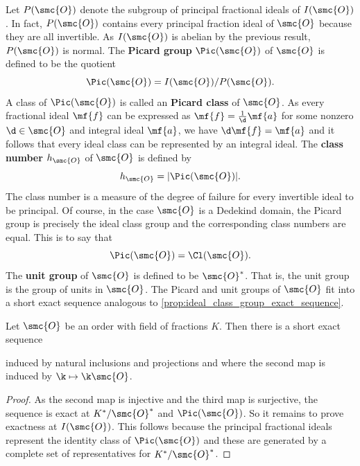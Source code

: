 \documentclass[12pt]{article}
\begin{document}
      Let \(P(\smc{O})\) denote the subgroup of principal fractional ideals of \(I(\smc{O})\). In fact, \(P(\smc{O})\) contains every principal fraction ideal of \(\smc{O}\) because they are all invertible. As \(I(\smc{O})\) is abelian by the previous result, \(P(\smc{O})\) is normal. The \textbf{Picard group} \(\Pic(\smc{O})\) of \(\smc{O}\) is defined to be the quotient
      \[
        \Pic(\smc{O}) = I(\smc{O})/P(\smc{O}).
      \]
      A class of \(\Pic(\smc{O})\) is called an \textbf{Picard class} of \(\smc{O}\). As every fractional ideal \(\mf{f}\) can be expressed as \(\mf{f} = \frac{1}{\d}\mf{a}\) for some nonzero \(\d \in \smc{O}\) and integral ideal \(\mf{a}\), we have \(\d\mf{f} = \mf{a}\) and it follows that every ideal class can be represented by an integral ideal. The \textbf{class number} \(h_{\smc{O}}\) of \(\smc{O}\) is defined by
      \[
        h_{\smc{O}} = |\Pic(\smc{O})|.
      \]
      The class number is a measure of the degree of failure for every invertible ideal to be principal. Of course, in the case \(\smc{O}\) is a Dedekind domain, the Picard group is precisely the ideal class group and the corresponding class numbers are equal. This is to say that
      \[
        \Pic(\smc{O}) = \Cl(\smc{O}).
      \]
      The \textbf{unit group} of \(\smc{O}\) is defined to be \(\smc{O}^{\ast}\). That is, the unit group is the group of units in \(\smc{O}\). The Picard and unit groups of \(\smc{O}\) fit into a short exact sequence analogous to \cref{prop:ideal_class_group_exact_sequence}.

      \begin{proposition}\label{prop:Picard_class_group_exact_sequence}
        Let \(\smc{O}\) be an order with field of fractions \(K\). Then there is a short exact sequence
        \begin{center}
        \end{center}
        induced by natural inclusions and projections and where the second map is induced by \(\k \mapsto \k\smc{O}\).
      \end{proposition}
      \begin{proof}
        As the second map is injective and the third map is surjective, the sequence is exact at \(K^{\ast}/\smc{O}^{\ast}\) and \(\Pic(\smc{O})\). So it remains to prove exactness at \(I(\smc{O})\). This follows because the principal fractional ideals represent the identity class of \(\Pic(\smc{O})\) and these are generated by a complete set of representatives for \(K^{\ast}/\smc{O}^{\ast}\).
      \end{proof}
\end{document}
